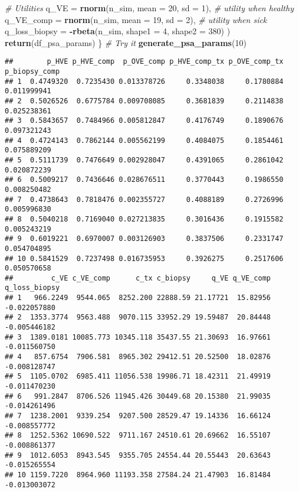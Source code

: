 \documentclass[
]{article}
\newenvironment{Shaded}{\begin{snugshade}}{\end{snugshade}}
\newcommand{\CommentTok}[1]{\textcolor[rgb]{0.56,0.35,0.01}{\textit{#1}}}
\newcommand{\DataTypeTok}[1]{\textcolor[rgb]{0.13,0.29,0.53}{#1}}
\newcommand{\DecValTok}[1]{\textcolor[rgb]{0.00,0.00,0.81}{#1}}
\newcommand{\KeywordTok}[1]{\textcolor[rgb]{0.13,0.29,0.53}{\textbf{#1}}}
\newcommand{\NormalTok}[1]{#1}
\newcommand{\OperatorTok}[1]{\textcolor[rgb]{0.81,0.36,0.00}{\textbf{#1}}}
\begin{document}
\begin{Shaded}
\begin{Highlighting}[]
    \CommentTok{# Utilities}
    \DataTypeTok{q_VE          =} \KeywordTok{rnorm}\NormalTok{(n_sim, }\DataTypeTok{mean =} \DecValTok{20}\NormalTok{, }\DataTypeTok{sd =} \DecValTok{1}\NormalTok{), }\CommentTok{# utility when healthy}
    \DataTypeTok{q_VE_comp     =} \KeywordTok{rnorm}\NormalTok{(n_sim, }\DataTypeTok{mean =} \DecValTok{19}\NormalTok{, }\DataTypeTok{sd =} \DecValTok{2}\NormalTok{), }\CommentTok{# utility when sick}
    \DataTypeTok{q_loss_biopsy =} \OperatorTok{-}\KeywordTok{rbeta}\NormalTok{(n_sim, }\DataTypeTok{shape1 =} \DecValTok{4}\NormalTok{, }\DataTypeTok{shape2 =} \DecValTok{380}\NormalTok{)}
\NormalTok{  )}
  \KeywordTok{return}\NormalTok{(df_psa_params)}
\NormalTok{\}}
\CommentTok{# Try it}
\KeywordTok{generate_psa_params}\NormalTok{(}\DecValTok{10}\NormalTok{) }
\end{Highlighting}
\end{Shaded}

\begin{verbatim}
##        p_HVE p_HVE_comp  p_OVE_comp p_HVE_comp_tx p_OVE_comp_tx p_biopsy_comp
## 1  0.4749320  0.7235430 0.013378726     0.3348038     0.1780884   0.011999941
## 2  0.5026526  0.6775784 0.009708085     0.3681839     0.2114838   0.025238361
## 3  0.5843657  0.7484966 0.005812847     0.4176749     0.1890676   0.097321243
## 4  0.4724143  0.7862144 0.005562199     0.4084075     0.1854461   0.075889209
## 5  0.5111739  0.7476649 0.002928047     0.4391065     0.2861042   0.020872239
## 6  0.5009217  0.7436646 0.028676511     0.3770443     0.1986550   0.008250482
## 7  0.4738643  0.7818476 0.002355727     0.4088189     0.2726996   0.005996830
## 8  0.5040218  0.7169040 0.027213835     0.3016436     0.1915582   0.005243219
## 9  0.6019221  0.6970007 0.003126903     0.3837506     0.2331747   0.054704895
## 10 0.5841529  0.7237498 0.016735953     0.3926275     0.2517606   0.050570658
##         c_VE c_VE_comp      c_tx c_biopsy     q_VE q_VE_comp q_loss_biopsy
## 1   966.2249  9544.065  8252.200 22888.59 21.17721  15.82956  -0.022057880
## 2  1353.3774  9563.488  9070.115 33952.29 19.59487  20.84448  -0.005446182
## 3  1389.0181 10085.773 10345.118 35437.55 21.30693  16.97661  -0.011560750
## 4   857.6754  7906.581  8965.302 29412.51 20.52500  18.02876  -0.008128747
## 5  1105.0702  6985.411 11056.538 19986.71 18.42311  21.49919  -0.011470230
## 6   991.2847  8706.526 11945.426 30449.68 20.15380  21.99035  -0.014261496
## 7  1238.2001  9339.254  9207.500 28529.47 19.14336  16.66124  -0.008557772
## 8  1252.5362 10690.522  9711.167 24510.61 20.69662  16.55107  -0.008861377
## 9  1012.6053  8943.545  9355.705 24554.44 20.55443  20.63643  -0.015265554
## 10 1159.7220  8964.960 11193.358 27584.24 21.47903  16.81484  -0.013003072
\end{verbatim}
\end{document}
